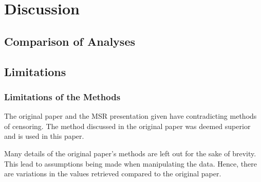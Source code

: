 \documentclass[acmconf]{acmart}
\begin{document}
\section{Discussion} \label{discussion}

\subsection{Comparison of Analyses} \label{compare}


\subsection{Limitations} \label{limit}

\subsubsection{Limitations of the Methods} \label{limit-methods}

The original paper \cite{ali2020cheating} and the MSR presentation given \cite{ali2020video} have contradicting methods of censoring.
The method discussed in the original paper was deemed superior and is used in this paper. 

Many details of the original paper's methods are left out for the sake of brevity.
This lead to assumptions being made when manipulating the data.
Hence, there are variations in the values retrieved compared to the original paper.
\end{document}
